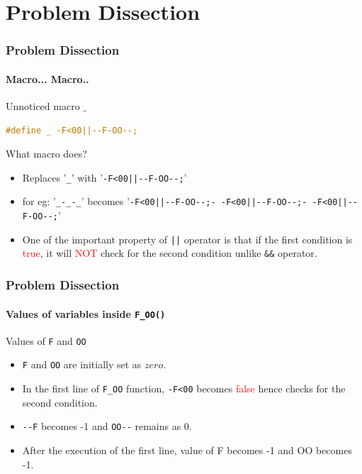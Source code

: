 \documentclass[12pt]{beamer}
\begin{document}
\section{Problem Dissection}
\begin{frame}[fragile]
	\frametitle {Problem Dissection}
	\framesubtitle {Macro... Macro..}
	\begin{block}{Unnoticed macro $\_$ }
		\begin{lstlisting}[language=C]
			#define _ -F<00||--F-OO--;
		\end{lstlisting}	
	\end{block}
	\begin{block}{What macro does?}
		\begin{itemize}
			\item Replaces '\texttt{\_}' with {\tiny '\texttt{-F<00||-{}-F-OO-{}-;}'}
			\item for eg: {\tiny '\texttt{\_-\_-\_}'} becomes {\tiny '\texttt{-F<00||-{}-F-OO-{}-;- -F<00||-{}-F-OO-{}-;- -F<00||-{}-F-OO-{}-;}'}
			\item One of the important property of \texttt{||} operator is that if the first condition is \textcolor{red}{true}, it will \textcolor{red}{NOT} check for the second condition unlike \texttt{\&\&} operator.
		\end{itemize}
	\end{block}
\end{frame}

\begin{frame}[fragile]
	\frametitle{Problem Dissection}
	\framesubtitle{Values of variables inside \texttt{F\_OO()}}
	\begin{block}{Values of \texttt{F} and \texttt{OO}}
		\begin{itemize}
			\item \texttt{F} and \texttt{OO} are initially set as $zero$. 
			\item In the first line of \texttt{F\_OO} function, \texttt{-F<00} becomes \textcolor{red}{false} hence checks for the second condition.
			\item \texttt{-{}-F} becomes -1 and \texttt{OO-{}-} remains as 0.
			\item After the execution of the first line, value of F becomes -1 and OO becomes -1.
		\end{itemize}				
	\end{block}
\end{frame}
\end{document}
